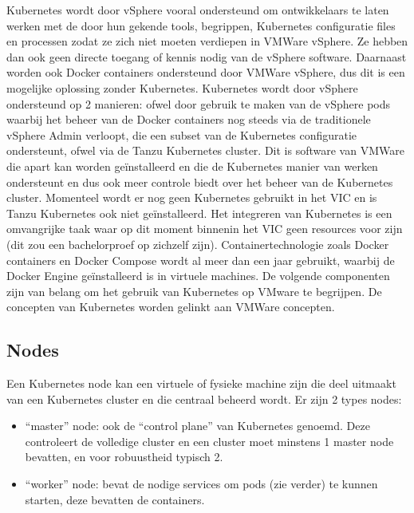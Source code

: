 \newline
\newline
Kubernetes wordt door vSphere vooral ondersteund om ontwikkelaars te laten werken met de door hun gekende tools, begrippen, Kubernetes configuratie files en processen zodat ze zich niet moeten verdiepen in VMWare vSphere. Ze hebben dan ook geen directe toegang of kennis nodig van de vSphere software.\autocite{VMware2019}
\newline
\newline
Daarnaast worden ook Docker containers ondersteund door VMWare vSphere, dus dit is een mogelijke oplossing zonder Kubernetes.
\newline
\newline
Kubernetes wordt door vSphere ondersteund op 2 manieren: ofwel door gebruik te maken van de vSphere pods waarbij het beheer van de Docker containers nog steeds via de traditionele vSphere Admin verloopt, die een subset van de Kubernetes configuratie ondersteunt, ofwel via de Tanzu Kubernetes cluster. Dit is software van VMWare die apart kan worden geïnstalleerd en die de Kubernetes manier van werken ondersteunt en dus ook meer controle biedt over het beheer van de Kubernetes cluster.
\newline
\newline
Momenteel wordt er nog geen Kubernetes gebruikt in het VIC en is Tanzu Kubernetes ook niet geïnstalleerd. Het integreren van Kubernetes is een omvangrijke taak waar op dit moment binnenin het VIC geen resources voor zijn (dit zou een bachelorproef op zichzelf zijn).
\newline
Containertechnologie zoals Docker containers en Docker Compose wordt al meer dan een jaar gebruikt, waarbij de Docker Engine geïnstalleerd is in virtuele machines.
\newline
\newline
De volgende componenten zijn van belang om het gebruik van Kubernetes op VMware te begrijpen. De concepten van Kubernetes worden gelinkt aan VMWare concepten.

\subsection{Nodes}
Een Kubernetes node kan een virtuele of fysieke machine zijn die deel uitmaakt van een Kubernetes cluster en die centraal beheerd wordt.
Er zijn 2 types nodes:
\begin{itemize}
    \item ``master'' node: ook de ``control plane'' van Kubernetes genoemd. Deze controleert de volledige cluster en een cluster moet minstens 1 master node bevatten, en voor robuustheid typisch 2.
    \item ``worker'' node: bevat de nodige services om pods (zie verder) te kunnen starten, deze bevatten de containers.
\end{itemize}
\autocite{NirShtein2023}
